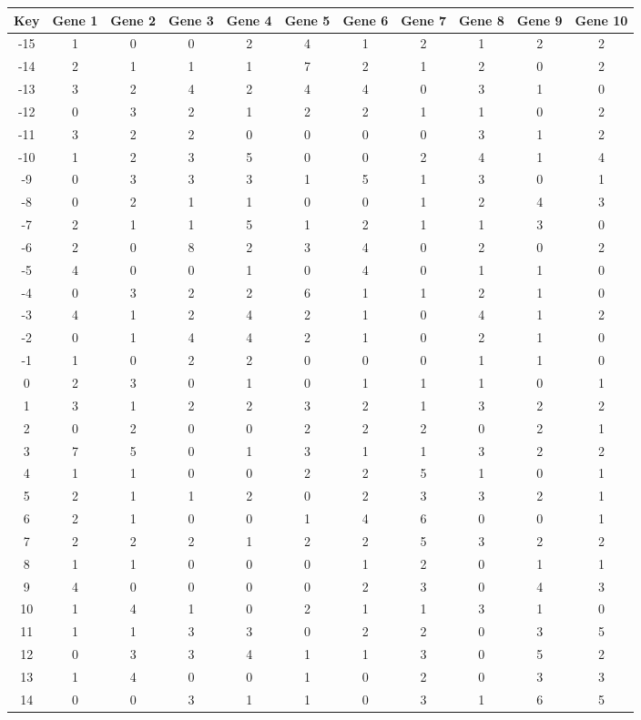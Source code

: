 \begin{tabular}{|c|c|c|c|c|c|c|c|c|c|c|}
\hline
Key & Gene 1 & Gene 2 & Gene 3 & Gene 4 & Gene 5 & Gene 6 & Gene 7 & Gene 8 & Gene 9 & Gene 10 \\
\hline
-15 & 1 & 0 & 0 & 2 & 4 & 1 & 2 & 1 & 2 & 2 \\
-14 & 2 & 1 & 1 & 1 & 7 & 2 & 1 & 2 & 0 & 2 \\
-13 & 3 & 2 & 4 & 2 & 4 & 4 & 0 & 3 & 1 & 0 \\
-12 & 0 & 3 & 2 & 1 & 2 & 2 & 1 & 1 & 0 & 2 \\
-11 & 3 & 2 & 2 & 0 & 0 & 0 & 0 & 3 & 1 & 2 \\
-10 & 1 & 2 & 3 & 5 & 0 & 0 & 2 & 4 & 1 & 4 \\
-9 & 0 & 3 & 3 & 3 & 1 & 5 & 1 & 3 & 0 & 1 \\
-8 & 0 & 2 & 1 & 1 & 0 & 0 & 1 & 2 & 4 & 3 \\
-7 & 2 & 1 & 1 & 5 & 1 & 2 & 1 & 1 & 3 & 0 \\
-6 & 2 & 0 & 8 & 2 & 3 & 4 & 0 & 2 & 0 & 2 \\
-5 & 4 & 0 & 0 & 1 & 0 & 4 & 0 & 1 & 1 & 0 \\
-4 & 0 & 3 & 2 & 2 & 6 & 1 & 1 & 2 & 1 & 0 \\
-3 & 4 & 1 & 2 & 4 & 2 & 1 & 0 & 4 & 1 & 2 \\
-2 & 0 & 1 & 4 & 4 & 2 & 1 & 0 & 2 & 1 & 0 \\
-1 & 1 & 0 & 2 & 2 & 0 & 0 & 0 & 1 & 1 & 0 \\
0 & 2 & 3 & 0 & 1 & 0 & 1 & 1 & 1 & 0 & 1 \\
1 & 3 & 1 & 2 & 2 & 3 & 2 & 1 & 3 & 2 & 2 \\
2 & 0 & 2 & 0 & 0 & 2 & 2 & 2 & 0 & 2 & 1 \\
3 & 7 & 5 & 0 & 1 & 3 & 1 & 1 & 3 & 2 & 2 \\
4 & 1 & 1 & 0 & 0 & 2 & 2 & 5 & 1 & 0 & 1 \\
5 & 2 & 1 & 1 & 2 & 0 & 2 & 3 & 3 & 2 & 1 \\
6 & 2 & 1 & 0 & 0 & 1 & 4 & 6 & 0 & 0 & 1 \\
7 & 2 & 2 & 2 & 1 & 2 & 2 & 5 & 3 & 2 & 2 \\
8 & 1 & 1 & 0 & 0 & 0 & 1 & 2 & 0 & 1 & 1 \\
9 & 4 & 0 & 0 & 0 & 0 & 2 & 3 & 0 & 4 & 3 \\
10 & 1 & 4 & 1 & 0 & 2 & 1 & 1 & 3 & 1 & 0 \\
11 & 1 & 1 & 3 & 3 & 0 & 2 & 2 & 0 & 3 & 5 \\
12 & 0 & 3 & 3 & 4 & 1 & 1 & 3 & 0 & 5 & 2 \\
13 & 1 & 4 & 0 & 0 & 1 & 0 & 2 & 0 & 3 & 3 \\
14 & 0 & 0 & 3 & 1 & 1 & 0 & 3 & 1 & 6 & 5 \\
\hline
\end{tabular}